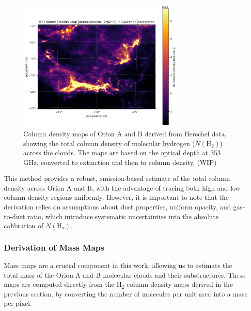 \begin{figure}[t]
    \centering
    \includegraphics[width=0.75\textwidth]{figures/column_density_map.png}
    \caption{Column density maps of Orion A and B derived from Herschel data, showing the total column density of molecular hydrogen ($N(\mathrm{H}_2)$) across the clouds. The maps are based on the optical depth at 353 GHz, converted to extinction and then to column density. (WIP)}
    \label{fig:n_h2_final_map}
\end{figure}

This method provides a robust, emission-based estimate of the total column density across Orion A and B, with the advantage of tracing both high and low column density regions uniformly. 
However, it is important to note that the derivation relies on assumptions about dust properties, uniform opacity, and gas-to-dust ratio, which introduce systematic uncertainties into the absolute calibration of $N(\mathrm{H}_2)$.


\subsubsection{Derivation of Mass Maps}

Mass maps are a crucial component in this work, allowing us to estimate the total mass of the Orion A and B molecular clouds and their substructures. These maps are computed directly from the H$_2$ column density maps derived in the previous section, by converting the number of molecules per unit area into a mass per pixel.

